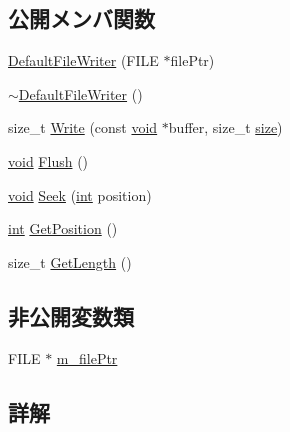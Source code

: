 \subsection*{公開メンバ関数}
\begin{DoxyCompactItemize}
\item 
\mbox{\hyperlink{class_effekseer_1_1_default_file_writer_a36fd2edb04fed0e00fd73c60767930ba}{Default\+File\+Writer}} (F\+I\+LE $\ast$file\+Ptr)
\item 
\mbox{\hyperlink{class_effekseer_1_1_default_file_writer_a23a94c58f15c27b02404b98a9dbd5a7e}{$\sim$\+Default\+File\+Writer}} ()
\item 
size\+\_\+t \mbox{\hyperlink{class_effekseer_1_1_default_file_writer_afceaff03cd45477058ffdc1370d06884}{Write}} (const \mbox{\hyperlink{namespace_effekseer_ab34c4088e512200cf4c2716f168deb56}{void}} $\ast$buffer, size\+\_\+t \mbox{\hyperlink{namespace_effekseer_a73c68f3d33539d30844b9d1e058077f7}{size}})
\item 
\mbox{\hyperlink{namespace_effekseer_ab34c4088e512200cf4c2716f168deb56}{void}} \mbox{\hyperlink{class_effekseer_1_1_default_file_writer_a3b652725044e257665b48de729e79094}{Flush}} ()
\item 
\mbox{\hyperlink{namespace_effekseer_ab34c4088e512200cf4c2716f168deb56}{void}} \mbox{\hyperlink{class_effekseer_1_1_default_file_writer_a2329533000c58267e8e2457f3480bf73}{Seek}} (\mbox{\hyperlink{namespace_effekseer_ace0abf7c2e6947e519ebe8b54cbcc30a}{int}} position)
\item 
\mbox{\hyperlink{namespace_effekseer_ace0abf7c2e6947e519ebe8b54cbcc30a}{int}} \mbox{\hyperlink{class_effekseer_1_1_default_file_writer_aa85409b51ae30ea259ce2d0f0bd30656}{Get\+Position}} ()
\item 
size\+\_\+t \mbox{\hyperlink{class_effekseer_1_1_default_file_writer_a6745621cb9db4dc7d33d89de8aae435e}{Get\+Length}} ()
\end{DoxyCompactItemize}
\subsection*{非公開変数類}
\begin{DoxyCompactItemize}
\item 
F\+I\+LE $\ast$ \mbox{\hyperlink{class_effekseer_1_1_default_file_writer_a66ba60cd1b40e5dfea801758b6d2b307}{m\+\_\+file\+Ptr}}
\end{DoxyCompactItemize}


\subsection{詳解}


